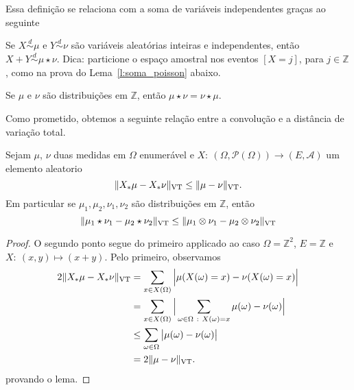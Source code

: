 \begin{topics}
Essa definição se relaciona com a soma de variáveis independentes graças ao seguinte
\begin{exercise}
Se $X \overset{d}\sim \mu$ e $Y \overset{d}\sim \nu$ são variáveis aleatórias inteiras e independentes, então $X + Y \overset{d}\sim \mu \star \nu$.
Dica: particione o espaço amostral nos eventos $[X = j]$, para $j \in \mathbb{Z}$, como na prova do Lema~\ref{l:soma_poisson} abaixo.
\end{exercise}

\begin{corollary}
Se $\mu$ e $\nu$ são distribuições em $\mathbb{Z}$, então $\mu \star \nu = \nu \star \mu$.
\end{corollary}

Como prometido, obtemos a seguinte relação entre a convolução e a distância de  variação total.
\begin{lemma}
\label{l:vt_conv}
Sejam $\mu$, $\nu$ duas medidas em $\Omega$ enumerável e $X:\  (\Omega,\mathcal{P}(\Omega))\to (E,\mathcal{A})$ um elemento aleatorio
\begin{equation}
   \lVert X_*\mu - X_*\nu\rVert_{\operatorname{VT}}\le    \lVert \mu - \nu\rVert_{\operatorname{VT}}.
\end{equation}
Em particular se $\mu_1, \mu_2, \nu_1, \nu_2$ são distribuições em $\mathbb{Z}$, então
\begin{equation}
  \lVert \mu_1 \star \nu_1 - \mu_2 \star \nu_2 \rVert_{\operatorname{VT}} \leq \lVert \mu_1 \otimes \nu_1 - \mu_2 \otimes \nu_2 \rVert_{\operatorname{VT}}
\end{equation}
\end{lemma}

\begin{proof}
O segundo ponto segue do primeiro applicado ao caso $\Omega = \mathbb{Z}^2$, $E=\mathbb{Z}$ e $X:\ (x,y) \mapsto (x+y)$.
Pelo primeiro, observamos
\begin{equation}
  \begin{split}
    2\lVert X_*\mu - X_*\nu\rVert_{\VT} &= \sum_{x \in X(\Omega)} \Big| \mu(X(\omega)=x) - \nu(X(\omega)=x) \Big|\\
    & =  \sum_{x \in X(\Omega)} \Big| \sum_{\omega \in\Omega \ : \ X(\omega)=x}  \mu(\omega) - \nu(\omega) \Big|\\
    & \leq \sum_{\omega \in \Omega} \big| \mu(\omega)- \nu(\omega) \big|\\
    & = 2\lVert \mu - \nu\rVert_{\VT}.
  \end{split}
\end{equation}
provando o lema.
\end{proof}


\end{topics}
